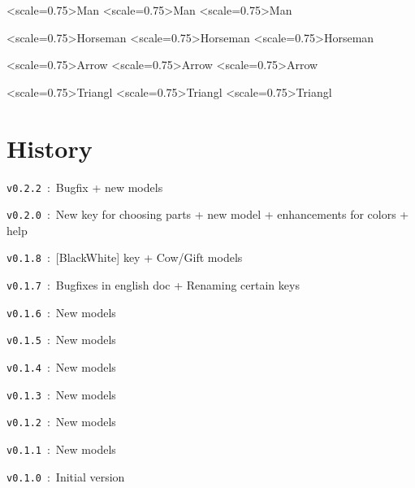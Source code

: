\documentclass{article}
\begin{document}
\begin{PresentationCode}{}
\end{PresentationCode}

\begin{PresentationCode}{}
\TangramTikz<scale=0.75>{Man}
\TangramTikz[Solution]<scale=0.75>{Man}
\TangramTikz[ColorSolution]<scale=0.75>{Man}
\end{PresentationCode}

\begin{PresentationCode}{}
\TangramTikz<scale=0.75>{Horseman}
\TangramTikz[Solution]<scale=0.75>{Horseman}
\TangramTikz[ColorSolution]<scale=0.75>{Horseman}
\end{PresentationCode}

\begin{PresentationCode}{}
\TangramTikz<scale=0.75>{Arrow}
\TangramTikz[Solution]<scale=0.75>{Arrow}
\TangramTikz[ColorSolution]<scale=0.75>{Arrow}
\end{PresentationCode}

\begin{PresentationCode}{}
\TangramTikz<scale=0.75>{Triangl}
\TangramTikz[Solution]<scale=0.75>{Triangl}
\TangramTikz[ColorSolution]<scale=0.75>{Triangl}
\end{PresentationCode}

\newpage

\part{History}

\verb|v0.2.2|~:~Bugfix + new models

\verb|v0.2.0|~:~New key for choosing parts + new model + enhancements for colors + help

\verb|v0.1.8|~:~\textsf{[BlackWhite]} key + \textsf{Cow}/\textsf{Gift} models

\verb|v0.1.7|~:~Bugfixes in english doc + Renaming certain keys

\verb|v0.1.6|~:~New models

\verb|v0.1.5|~:~New models

\verb|v0.1.4|~:~New models

\verb|v0.1.3|~:~New models

\verb|v0.1.2|~:~New models

\verb|v0.1.1|~:~New models

\verb|v0.1.0|~:~Initial version
\end{document}
